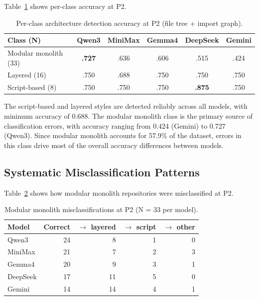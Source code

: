 Table~\ref{tab:eval_per_class} shows per-class accuracy at P2.

\begin{table}[H]
\centering
\small
\caption{Per-class architecture detection accuracy at P2 (file tree + import graph).}
\label{tab:eval_per_class}
\begin{tabular}{lccccc}
\toprule
\textbf{Class (N)} & \textbf{Qwen3} & \textbf{MiniMax} & \textbf{Gemma4} & \textbf{DeepSeek} & \textbf{Gemini} \\
\midrule
Modular monolith (33) & \textbf{.727} & .636 & .606 & .515 & .424 \\
Layered (16)          & .750 & .688 & .750 & .750 & .750 \\
Script-based (8)      & .750 & .750 & .750 & \textbf{.875} & .750 \\
\bottomrule
\end{tabular}
\end{table}

The script-based and layered styles are detected reliably across all models, with minimum accuracy of 0.688. The modular monolith class is the primary source of classification errors, with accuracy ranging from 0.424 (Gemini) to 0.727 (Qwen3). Since modular monolith accounts for 57.9\% of the dataset, errors in this class drive most of the overall accuracy differences between models.

\subsection{Systematic Misclassification Patterns}
\label{subsec:eval_misclassification}

Table~\ref{tab:eval_mm_errors} shows how modular monolith repositories were misclassified at P2.

\begin{table}[H]
\centering
\small
\caption{Modular monolith misclassifications at P2 (N = 33 per model).}
\label{tab:eval_mm_errors}
\begin{tabular}{lrrrr}
\toprule
\textbf{Model} & \textbf{Correct} & $\to$ \textbf{layered} & $\to$ \textbf{script} & $\to$ \textbf{other} \\
\midrule
Qwen3    & 24 & 8  & 1 & 0 \\
MiniMax  & 21 & 7  & 2 & 3 \\
Gemma4   & 20 & 9  & 3 & 1 \\
DeepSeek & 17 & 11 & 5 & 0 \\
Gemini   & 14 & 14 & 4 & 1 \\
\bottomrule
\end{tabular}
\end{table}

